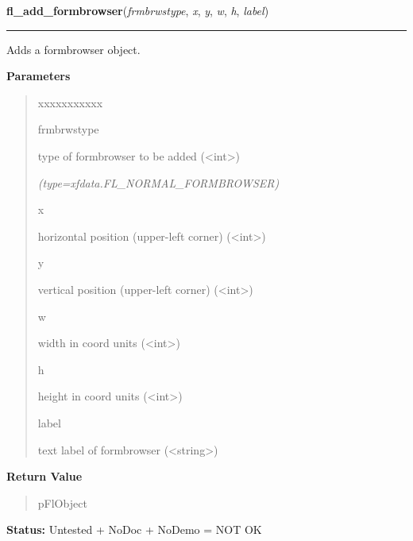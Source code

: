 \hspace{.8\funcindent}\begin{boxedminipage}{\funcwidth}

    \raggedright \textbf{fl\_add\_formbrowser}(\textit{frmbrwstype}, \textit{x}, \textit{y}, \textit{w}, \textit{h}, \textit{label})

    \vspace{-1.5ex}

    \rule{\textwidth}{0.5\fboxrule}
\setlength{\parskip}{2ex}
    Adds a formbrowser object.

\setlength{\parskip}{1ex}
      \textbf{Parameters}
      \vspace{-1ex}

      \begin{quote}
        \begin{Ventry}{xxxxxxxxxxx}

          \item[frmbrwstype]

          type of formbrowser to be added ({\textless}int{\textgreater})

            {\it (type=xfdata.FL\_NORMAL\_FORMBROWSER)}

          \item[x]

          horizontal position (upper-left corner) 
          ({\textless}int{\textgreater})

          \item[y]

          vertical position (upper-left corner) 
          ({\textless}int{\textgreater})

          \item[w]

          width in coord units ({\textless}int{\textgreater})

          \item[h]

          height in coord units ({\textless}int{\textgreater})

          \item[label]

          text label of formbrowser ({\textless}string{\textgreater})

        \end{Ventry}

      \end{quote}

      \textbf{Return Value}
    \vspace{-1ex}

      \begin{quote}
      pFlObject

      \end{quote}

\textbf{Status:} Untested + NoDoc + NoDemo = NOT OK



    \end{boxedminipage}

